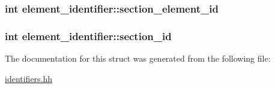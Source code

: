 \subsubsection[{\texorpdfstring{section\+\_\+element\+\_\+id}{section_element_id}}]{\setlength{\rightskip}{0pt plus 5cm}int element\+\_\+identifier\+::section\+\_\+element\+\_\+id}\hypertarget{structelement__identifier_a8f54674a7794f520435a7c9cc13057e9}{}\label{structelement__identifier_a8f54674a7794f520435a7c9cc13057e9}
\subsubsection[{\texorpdfstring{section\+\_\+id}{section_id}}]{\setlength{\rightskip}{0pt plus 5cm}int element\+\_\+identifier\+::section\+\_\+id}\hypertarget{structelement__identifier_a28ecafe70b469746ec1a4e2d58511637}{}\label{structelement__identifier_a28ecafe70b469746ec1a4e2d58511637}


The documentation for this struct was generated from the following file\+:\begin{DoxyCompactItemize}
\item 
\hyperlink{identifiers_8hh}{identifiers.\+hh}\end{DoxyCompactItemize}
